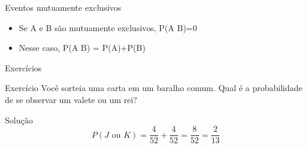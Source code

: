 \documentclass{beamer}
\begin{document}
\begin{frame}{Eventos mutuamente exclusivos}
  \begin{itemize}
  \item Se A e B são mutuamente exclusivos, P(A  B)=0
  \item Nesse caso, P(A  B) = P(A)+P(B)
  \end{itemize}
\end{frame}

\begin{frame}{Exercícios}
  \begin{block}{Exercício}
    Você sorteia uma carta em um baralho comum. Qual é a probabilidade
    de se observar um valete ou um rei?
  \end{block}
  \begin{block}{Solução}
    \begin{displaymath}
      P(J \text{ ou } K) = \frac{4}{52} + \frac{4}{52} = \frac{8}{52} = \frac{2}{13}
    \end{displaymath}
  \end{block}
\end{frame}
\end{document}
